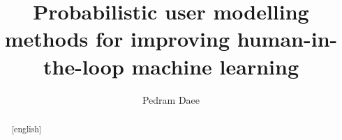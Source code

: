 \documentclass[dissertation,math,vertlayout,pdfa,colorlinks]{aaltoseries}
\author{Pedram Daee}
\title{Probabilistic user modelling methods for improving human-in-the-loop machine learning} %
\begin{document}





\begin{abstract}[english]
	

\end{abstract}
\end{document}
